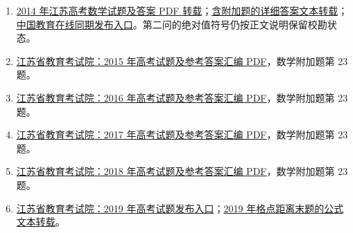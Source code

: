\documentclass[UTF8,12pt,a4paper,fontset=fandol]{ctexart}
\begin{document}
\begin{enumerate}
\item\label{src:g2014} \href{https://mat1.gtimg.com/edu/PDF/jsws.pdf}{2014 年江苏高考数学试题及答案 PDF 转载}；\href{https://www.renrendoc.com/paper/207419020.html}{含附加题的详细答案文本转载}；\href{https://gaokao.eol.cn/shiti/zhenti/201406/t20140607_1127957.shtml}{中国教育在线同期发布入口}。第二问的绝对值符号仍按正文说明保留校勘状态。
\item\label{src:g2015} \href{https://www.jseea.cn/webfile/upload/old/contents/channel_6/2015/06/1506101049510.pdf}{江苏省教育考试院：2015 年高考试题及参考答案汇编 PDF}，数学附加题第 23 题。
\item\label{src:g2016} \href{https://www.jseea.cn/webfile/upload/old/contents/channel_173/2016/06/1606100927946.pdf}{江苏省教育考试院：2016 年高考试题及参考答案汇编 PDF}，数学附加题第 23 题。
\item\label{src:g2017} \href{https://www.jseea.cn/webfile/upload/old/contents/channel_1/2017/06/1706092140912.pdf}{江苏省教育考试院：2017 年高考试题及参考答案汇编 PDF}，数学附加题第 23 题。
\item\label{src:g2018} \href{https://www.jseea.cn/webfile/upload/old/contents/channel_173/2018/06/1806100757613.pdf}{江苏省教育考试院：2018 年高考试题及参考答案汇编 PDF}，数学附加题第 23 题。
\item\label{src:g2019} \href{https://www.jseea.cn/webfile/highschool_ptgk_data/2019-06-10/6514.html}{江苏省教育考试院：2019 年高考试题发布入口}；\href{https://gaokaohub.com/q/item/102459044642881.html}{2019 年格点距离末题的公式文本转载}。
\end{enumerate}
\end{document}
